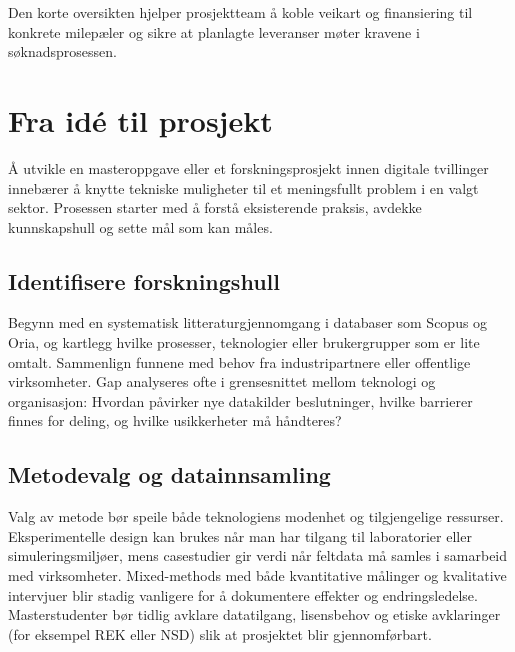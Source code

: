 Den korte oversikten hjelper prosjektteam å koble veikart og finansiering til konkrete milepæler og sikre at planlagte leveranser møter kravene i søknadsprosessen.\citep{rcn2024programkatalog,rcn2024digitalisering}

\section{Fra idé til prosjekt}
Å utvikle en masteroppgave eller et forskningsprosjekt innen digitale tvillinger innebærer å knytte tekniske muligheter til et meningsfullt problem i en valgt sektor. Prosessen starter med å forstå eksisterende praksis, avdekke kunnskapshull og sette mål som kan måles.

\subsection{Identifisere forskningshull}
Begynn med en systematisk litteraturgjennomgang i databaser som Scopus og Oria, og kartlegg hvilke prosesser, teknologier eller brukergrupper som er lite omtalt. Sammenlign funnene med behov fra industripartnere eller offentlige virksomheter. Gap analyseres ofte i grensesnittet mellom teknologi og organisasjon: Hvordan påvirker nye datakilder beslutninger, hvilke barrierer finnes for deling, og hvilke usikkerheter må håndteres?

\subsection{Metodevalg og datainnsamling}
Valg av metode bør speile både teknologiens modenhet og tilgjengelige ressurser. Eksperimentelle design kan brukes når man har tilgang til laboratorier eller simuleringsmiljøer, mens casestudier gir verdi når feltdata må samles i samarbeid med virksomheter. Mixed-methods med både kvantitative målinger og kvalitative intervjuer blir stadig vanligere for å dokumentere effekter og endringsledelse. Masterstudenter bør tidlig avklare datatilgang, lisensbehov og etiske avklaringer (for eksempel REK eller NSD) slik at prosjektet blir gjennomførbart.

